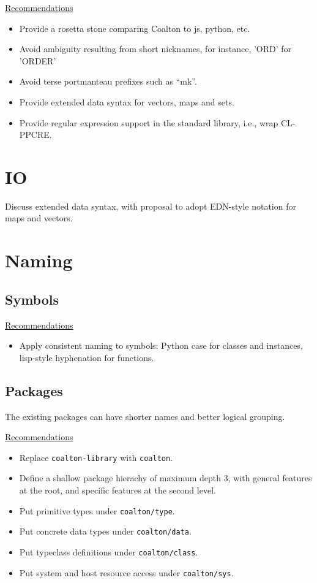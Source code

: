 \documentclass[12pt]{article}
\newcommand{\code}{\texttt}
\begin{document}
\medskip
\underline{Recommendations}

\begin{itemize}
\item Provide a rosetta stone comparing Coalton to js, python, etc.
\item Avoid ambiguity resulting from short nicknames, for instance,
  'ORD' for 'ORDER'
\item Avoid terse portmanteau prefixes such as ``mk''.
\item Provide extended data syntax for vectors, maps and sets.
\item Provide regular expression support in the standard library,
  i.e., wrap CL-PPCRE.

\end{itemize}

\section{IO}

Discuss extended data syntax, with proposal to adopt EDN-style
notation for maps and vectors.

\section{Naming}

\subsection{Symbols}

\medskip
\underline{Recommendations}
\begin{itemize}
\item Apply consistent naming to symbols: Python case for classes and instances, lisp-style hyphenation for functions.
\end{itemize}

\subsection{Packages}

The existing packages can have shorter names and better logical grouping.

\medskip
\underline{Recommendations}
\begin{itemize}
\item Replace \code{coalton-library} with \code{coalton}.
\item Define a shallow package hierachy of maximum depth 3, with
  general features at the root, and specific features at the second
  level.
\item Put primitive types under \code{coalton/type}.
\item Put concrete data types under \code{coalton/data}.
\item Put typeclass definitions under \code{coalton/class}.
\item Put system and host resource access under \code{coalton/sys}.
\end{itemize}
\end{document}
